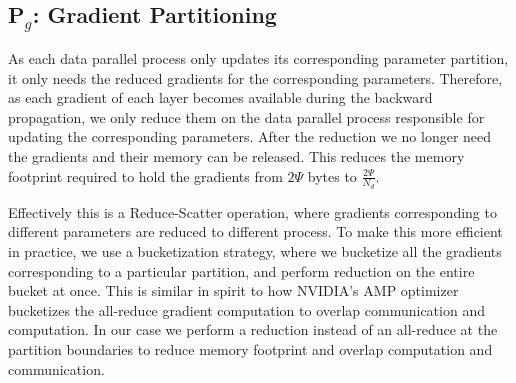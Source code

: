 \documentclass{article}
\begin{document}
\subsection{P$_g$: Gradient Partitioning}\label{sec:pg}
As each data parallel process only updates its corresponding parameter partition, it only needs the reduced gradients for the corresponding parameters. Therefore, as each gradient of each layer becomes available during the backward propagation, we only reduce them on the data parallel process responsible for updating the corresponding parameters. After the reduction we no longer need the gradients and their memory can be released. This reduces the memory footprint required to hold the gradients from $2\Psi$ bytes to $\frac{2\Psi}{N_d}$. 

Effectively this is a Reduce-Scatter operation, where gradients corresponding to different parameters are reduced to different process. To make this more efficient in practice, we use a bucketization strategy, where we bucketize all the gradients corresponding to a particular partition, and perform reduction on the entire bucket at once. 
This is similar in spirit to how NVIDIA's AMP \cite{nvidia-apex} optimizer bucketizes the all-reduce gradient computation to overlap communication and computation. In our case we perform a reduction instead of an all-reduce at the partition boundaries to reduce memory footprint and overlap computation and communication. 
\end{document}
